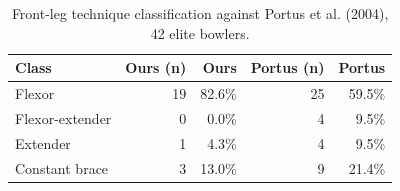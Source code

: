 \begin{table}[htbp]
  \centering
  \caption{Front-leg technique classification against Portus et al. (2004), 42 elite bowlers.}
  \label{tab:technique}
  \begin{tabular}{lrrrr}
    \toprule
    Class & Ours (n) & Ours & Portus (n) & Portus \\
    \midrule
    Flexor & 19 & 82.6\% & 25 & 59.5\% \\
    Flexor-extender & 0 & 0.0\% & 4 & 9.5\% \\
    Extender & 1 & 4.3\% & 4 & 9.5\% \\
    Constant brace & 3 & 13.0\% & 9 & 21.4\% \\
    \bottomrule
  \end{tabular}
\end{table}
